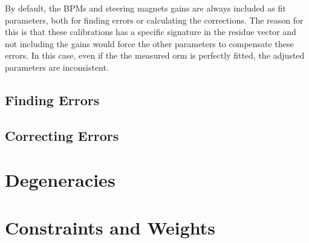 By default, the BPMs and steering magnets gains are always included as fit parameters, both for finding errors or calculating the corrections. The reason for this is that these calibrations has a specific signature in the residue vector and not including the gains would force the other parameters to compensate these errors. In this case, even if the the measured \gls{orm} is perfectly fitted, the adjusted parameters are inconsistent. 

\subsection{Finding Errors}

\subsection{Correcting Errors}

\section{Degeneracies}
\section{Constraints and Weights}

